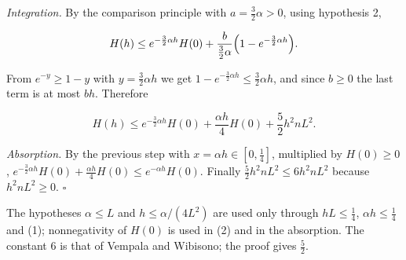 \documentclass[11pt,a4paper]{article}
\begin{document}
\emph{Integration.} By the comparison principle \cite[Section~3.2.1]{LangevinLean2026ULALSI} with \(a=\frac32\alpha>0\), using hypothesis 2,


\[H(h)\le e^{-\frac32\alpha h}H(0)+\frac{b}{\frac32\alpha}\Bigl(1-e^{-\frac32\alpha h}\Bigr).\]


From \(e^{-y}\ge1-y\) with \(y=\frac32\alpha h\) we get \(1-e^{-\frac32\alpha h}\le\frac32\alpha h\), and since \(b\ge0\) the last term is at most \(bh\). Therefore


\[H(h)\le e^{-\frac32\alpha h}H(0)+\frac{\alpha h}4H(0)+\frac52h^2nL^2.\]


\emph{Absorption.} By the previous step with \(x=\alpha h\in[0,\frac14]\), multiplied by \(H(0)\ge0\), \(e^{-\frac32\alpha h}H(0)+\frac{\alpha h}4H(0)\le e^{-\alpha h}H(0)\). Finally \(\frac52h^2nL^2\le6h^2nL^2\) because \(h^2nL^2\ge0\). \(\square\)




The hypotheses \(\alpha\le L\) and \(h\le\alpha/(4L^2)\) are used only through \(hL\le\frac14\), \(\alpha h\le\frac14\) and (1); nonnegativity of \(H(0)\) is used in (2) and in the absorption. The constant \(6\) is that of Vempala and Wibisono; the proof gives \(\frac52\).
\end{document}
